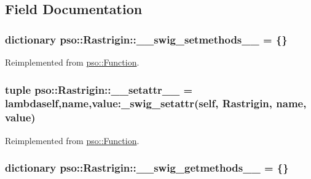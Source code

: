 \subsection{Field Documentation}
\hypertarget{classpso_1_1Rastrigin_6669f18ee53e453abd57a7414869091c}{
\subsubsection{\setlength{\rightskip}{0pt plus 5cm}dictionary {\bf pso::Rastrigin::\_\-\_\-swig\_\-setmethods\_\-\_\-} = \{\}}}
\label{classpso_1_1Rastrigin_6669f18ee53e453abd57a7414869091c}




Reimplemented from \hyperlink{classpso_1_1Function_2334bfe507115d58047f67960dde71d3}{pso::Function}.\hypertarget{classpso_1_1Rastrigin_cf1c6ea103beabbdb11abbd8a0e6d1fc}{
\subsubsection{\setlength{\rightskip}{0pt plus 5cm}tuple {\bf pso::Rastrigin::\_\-\_\-setattr\_\-\_\-} = lambdaself,name,value:\_\-swig\_\-setattr(self, {\bf Rastrigin}, name, value)}}
\label{classpso_1_1Rastrigin_cf1c6ea103beabbdb11abbd8a0e6d1fc}




Reimplemented from \hyperlink{classpso_1_1Function_cd8775cf6aadc3fdf4e6d82158ef10fb}{pso::Function}.\hypertarget{classpso_1_1Rastrigin_ff2a6f19b803ab401dc52374ea84bf27}{
\subsubsection{\setlength{\rightskip}{0pt plus 5cm}dictionary {\bf pso::Rastrigin::\_\-\_\-swig\_\-getmethods\_\-\_\-} = \{\}}}
\label{classpso_1_1Rastrigin_ff2a6f19b803ab401dc52374ea84bf27}





